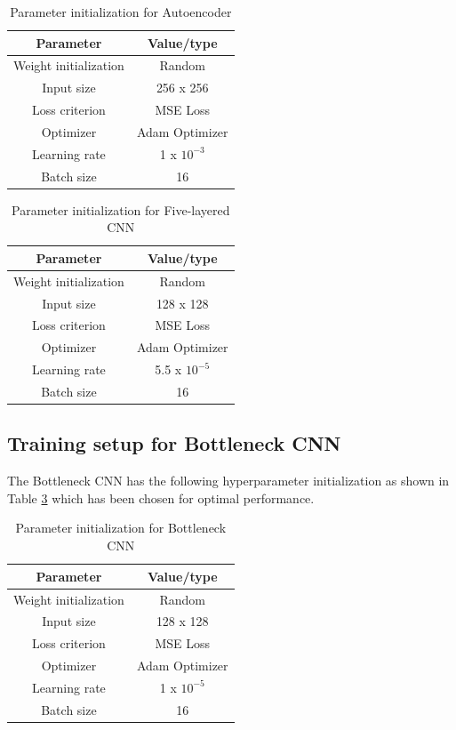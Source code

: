 \begin{table}[ht]
\centering
\caption{Parameter initialization for Autoencoder}
\renewcommand{\arraystretch}{2} 
\begin{tabular}{|c|c|}
\hline
\textbf{Parameter} & \textbf{Value/type} \\  \hline
Weight initialization & Random \\ \hline
Input size & 256 x 256 \\ \hline
Loss criterion & MSE Loss \\ \hline
Optimizer & Adam Optimizer \\ \hline
Learning rate & 1 x $10^{-3}$ \\ \hline
Batch size & 16 \\ \hline
\end{tabular}
\label{table: auto}
\end{table}

\begin{table}[ht]
\centering
\caption{Parameter initialization for Five-layered CNN}
\renewcommand{\arraystretch}{2} 
\begin{tabular}{|c|c|}
\hline
\textbf{Parameter} & \textbf{Value/type} \\ \hline
Weight initialization & Random \\ \hline
Input size & 128 x 128 \\ \hline
Loss criterion & MSE Loss \\ \hline
Optimizer & Adam Optimizer \\ \hline
Learning rate & 5.5 x $10^{-5}$ \\ \hline
Batch size & 16 \\ \hline
\end{tabular}
\label{table: CNN}
\end{table}

\subsection{Training setup for Bottleneck CNN}
\vspace{1em}
The Bottleneck CNN has the following hyperparameter initialization as shown in Table \ref{table: bottleneck} which has been chosen for optimal performance.
\newpage
\begin{table}[ht]
\centering
\caption{Parameter initialization for Bottleneck CNN}
\renewcommand{\arraystretch}{2} 
\begin{tabular}{|c|c|}
\hline
\textbf{Parameter} & \textbf{Value/type} \\ \hline
Weight initialization & Random \\ \hline
Input size & 128 x 128 \\ \hline
Loss criterion & MSE Loss \\ \hline
Optimizer & Adam Optimizer \\ \hline
Learning rate & 1 x $10^{-5}$ \\ \hline
Batch size & 16 \\ \hline
\end{tabular}
\label{table: bottleneck}
\end{table}

